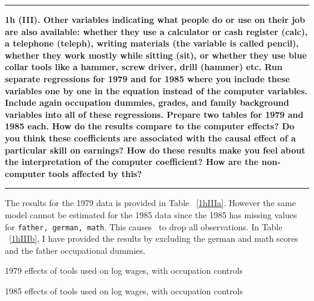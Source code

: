 \documentclass[12pt]{article}
\newcommand\question[1]{\vspace{1em}\hrule\vspace{1em}\textbf{#1}\vspace{1em}\hrule\vspace{1em}}
\begin{document}
\newpage
\question{1h (III). Other variables indicating what people do or use on their job are also available: whether they use a calculator or cash register (calc), a telephone (teleph), writing materials (the variable is called pencil), whether they work mostly while sitting (sit), or whether they use blue collar tools like a hammer, screw driver, drill (hammer) etc. Run separate regressions for 1979 and for 1985 where you include these variables one by one in the equation instead of the computer variables. Include again occupation dummies, grades, and family background variables into all of these regressions. Prepare two tables for 1979 and 1985 each. How do the results compare to the computer effects? Do you think these coefficients are associated with the causal effect of a particular skill on earnings? How do these results make you feel about the interpretation of the computer coefficient? How are the non-computer tools affected by this?}
The results for the 1979 data is provided in Table ~\ref{1hIIIa}. However the same model cannot be estimated for the 1985 data since the 1985 has missing values for \texttt{father, german, math}. This causes \stata \  to drop all observations. In Table ~\ref{1hIIIb}, I have provided the results by excluding the german and math scores and the father occupational dummies.

\begin{center}
\begin{table}
\caption{1979 effects of tools used on log wages, with occupation controls}

\label{1hIIIa}
\end{table}
\newpage
\begin{table}
\caption{1985 effects of tools used on log wages, with occupation controls}

\label{1hIIIb}
\end{table}
\end{center}
\end{document}
